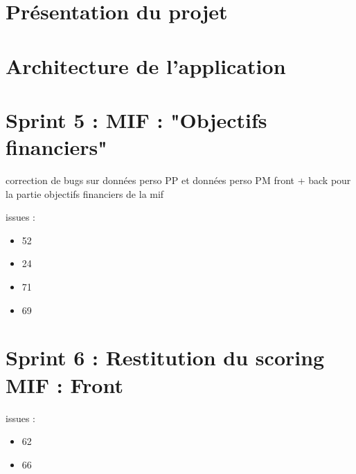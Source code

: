 
\section{Présentation du projet}
	

\section{Architecture de l'application}
	
	
\section{Sprint 5 : MIF : "Objectifs financiers"}
	
	
	correction de bugs sur données perso PP et données perso PM
	front  + back pour la partie objectifs financiers de la mif
	
issues :
\begin{itemize}
	\item 52
	\item 24
	\item 71
	\item 69
\end{itemize}	

\section{Sprint 6 : Restitution du scoring MIF : Front}
	

issues :
\begin{itemize}
	\item 62
	\item 66
\end{itemize}
	
